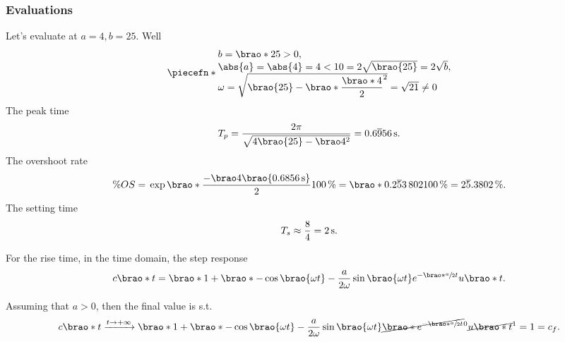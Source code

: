 \documentclass[12pt]{article}
\newcommand*\siexpr[2][]{\SI[parse-numbers=false,#1]{#2}}%
\DeclarePairedDelimiter\brao()%
\DeclarePairedDelimiter\abs||
\DeclarePairedDelimiter\piecefn\{.
\begin{document}
\begin{enumerate}[(a)]
        \subsubsection{Evaluations}
        Let's evaluate at $a = 4, b = 25$. Well
        \begin{equation}
            \piecefn*{
                \begin{array}{@{}l@{}}
                    b = \brao*{25} > 0,
                \\*
                    \abs{a} = \abs{4} = 4 < 10 = 2\sqrt{\brao{25}} = 2\sqrt{b},
                \\*
                    \omega = \sqrt{\brao{25} - \brao*{\dfrac{\brao*4}2}^2} = \sqrt{21} \not= 0
                \\*
                \end{array}
            }
        \end{equation}
        The peak time
        \begin{equation}
            T_p = \frac{2\pi}{\sqrt{4\brao{25} - \brao4^2}} = \siexpr{0.6\overline956}\second.
        \end{equation}
        The overshoot rate
        \begin{equation}
                \% OS
                ={} \exp\brao*{\frac{-\brao4\brao{\SI{0.6856}\second}}2} \SI{100}\percent
                = \brao*{0.2\overline53\,802}{\SI{100}\percent}
                = \siexpr{2\overline5.3802}\percent.
        \end{equation}
        The setting time
        \begin{equation}
            T_s \approx \frac84 = \SI2\second.
        \end{equation}

        For the rise time, in the time domain, the step response
        \begin{equation}
            \begin{aligned}
                c\brao*t = \brao*{1 + \brao*{-\cos\brao{\omega t} - \frac{a}{2\omega} \sin\brao{\omega t} }{e^{-\brao*{\sfrac{a}2}t}}}u\brao*t.
            \end{aligned}
        \end{equation}

        Assuming that $a > 0$, then the final value is s.t.
        \begin{equation}
            c\brao*t
            \xrightarrow{t\to+\infty} \brao*{1 + \brao*{-\cos\brao{\omega t} - \frac{a}{2\omega} \sin\brao{\omega t} }\cancel{\brao*{e^{-\brao*{\sfrac{a}2}t}}}^0} \cancel{u\brao*t}^1 = 1 = c_f.
        \end{equation}


\end{enumerate}
\end{document}
